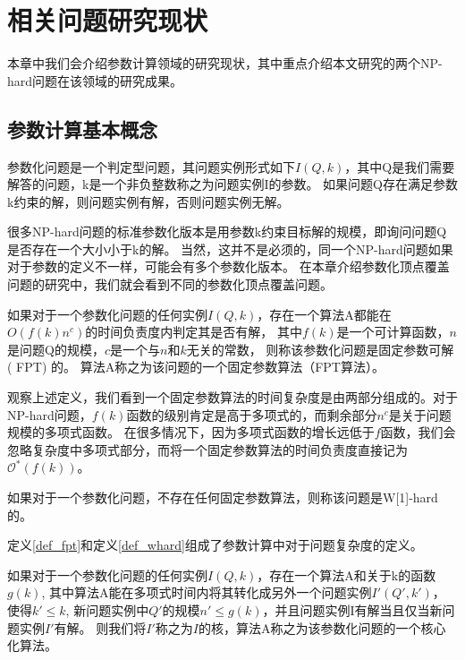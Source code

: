 \chapter{相关问题研究现状}
本章中我们会介绍参数计算领域的研究现状，其中重点介绍本文研究的两个NP-hard问题在该领域的研究成果。
\section{参数计算基本概念}
\begin{definition} [参数化问题]
参数化问题是一个判定型问题，其问题实例形式如下$I(Q, k)$，其中Q是我们需要解答的问题，k是一个非负整数称之为问题实例I的参数。
如果问题Q存在满足参数k约束的解，则问题实例有解，否则问题实例无解。
\end{definition}

很多NP-hard问题的标准参数化版本是用参数k约束目标解的规模，即询问问题Q是否存在一个大小小于k的解。
当然，这并不是必须的，同一个NP-hard问题如果对于参数的定义不一样，可能会有多个参数化版本。
在本章介绍参数化顶点覆盖问题的研究中，我们就会看到不同的参数化顶点覆盖问题。

\begin{definition}  \label{def_fpt}
如果对于一个参数化问题的任何实例$I(Q, k)$，存在一个算法A都能在$O(f(k)n^c)$的时间负责度内判定其是否有解，
其中$f(k)$是一个可计算函数，$n$是问题Q的规模，$c$是一个与$n$和$k$无关的常数，
则称该参数化问题是固定参数可解( FPT) 的。
算法A称之为该问题的一个固定参数算法（FPT算法）。
\end{definition}

观察上述定义，我们看到一个固定参数算法的时间复杂度是由两部分组成的。对于NP-hard问题，$f(k)$函数的级别肯定是高于多项式的，而剩余部分$n^c$是关于问题规模的多项式函数。
在很多情况下，因为多项式函数的增长远低于$f$函数，我们会忽略复杂度中多项式部分，而将一个固定参数算法的时间负责度直接记为$\mathcal{O}^*(f(k))$。

\begin{definition}  \label{def_whard}
如果对于一个参数化问题，不存在任何固定参数算法，则称该问题是W[1]-hard的。
\end{definition}

定义\ref{def_fpt}和定义\ref{def_whard}组成了参数计算中对于问题复杂度的定义。

\begin{definition}[核(kernel)]
如果对于一个参数化问题的任何实例$I(Q, k)$，存在一个算法A和关于k的函数$g(k)$,
其中算法A能在多项式时间内将其转化成另外一个问题实例$I'(Q',k')$，
使得$k' \le k$, 新问题实例中$Q'$的规模$n' \le g(k)$，并且问题实例I有解当且仅当新问题实例$I'$有解。
则我们将$I'$称之为$I$的核，算法A称之为该参数化问题的一个核心化算法。
\end{definition}

